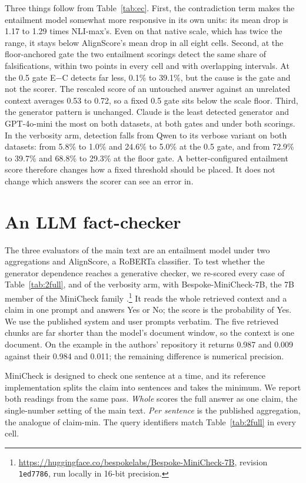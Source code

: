 \documentclass[11pt]{article}
\begin{document}
Three things follow from Table~\ref{tab:ec}. First, the contradiction term makes the entailment model somewhat more responsive in its own units: its mean drop is 1.17 to 1.29 times NLI-max's. Even on that native scale, which has twice the range, it stays below AlignScore's mean drop in all eight cells. Second, at the floor-anchored gate the two entailment scorings detect the same share of falsifications, within two points in every cell and with overlapping intervals. At the 0.5 gate E$-$C detects far less, 0.1\% to 39.1\%, but the cause is the gate and not the scorer. The rescaled score of an untouched answer against an unrelated context averages 0.53 to 0.72, so a fixed 0.5 gate sits below the scale floor. Third, the generator pattern is unchanged. Claude is the least detected generator and GPT-4o-mini the most on both datasets, at both gates and under both scorings. In the verbosity arm, detection falls from Qwen to its verbose variant on both datasets: from 5.8\% to 1.0\% and 24.6\% to 5.0\% at the 0.5 gate, and from 72.9\% to 39.7\% and 68.8\% to 29.3\% at the floor gate. A better-configured entailment score therefore changes how a fixed threshold should be placed. It does not change which answers the scorer can see an error in.

\section{An LLM fact-checker}
\label{app:minicheck}

The three evaluators of the main text are an entailment model under two aggregations and AlignScore, a RoBERTa classifier. To test whether the generator dependence reaches a generative checker, we re-scored every case of Table~\ref{tab:2full}, and of the verbosity arm, with Bespoke-MiniCheck-7B, the 7B member of the MiniCheck family \citep{tang-etal-2024}.\footnote{\url{https://huggingface.co/bespokelabs/Bespoke-MiniCheck-7B}, revision \texttt{1ed7786}, run locally in 16-bit precision.} It reads the whole retrieved context and a claim in one prompt and answers Yes or No; the score is the probability of Yes. We use the published system and user prompts verbatim. The five retrieved chunks are far shorter than the model's document window, so the context is one document. On the example in the authors' repository it returns 0.987 and 0.009 against their 0.984 and 0.011; the remaining difference is numerical precision.

MiniCheck is designed to check one sentence at a time, and its reference implementation splits the claim into sentences and takes the minimum. We report both readings from the same pass. \emph{Whole} scores the full answer as one claim, the single-number setting of the main text. \emph{Per sentence} is the published aggregation, the analogue of claim-min. The query identifiers match Table~\ref{tab:2full} in every cell.
\end{document}
